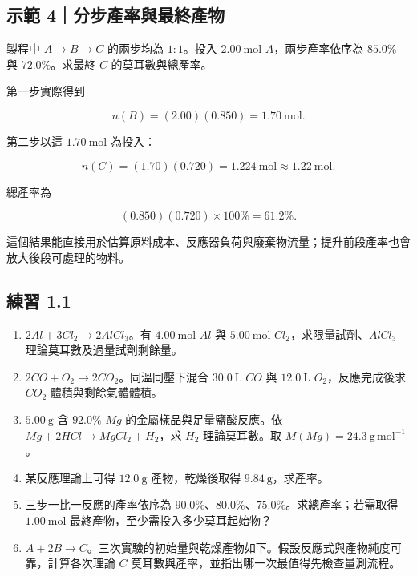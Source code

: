 \documentclass[11pt,a4paper]{article}
\providecommand{\tightlist}{%
  \setlength{\itemsep}{0pt}\setlength{\parskip}{0pt}}
\begin{document}
\begin{HandoutWorkedExample}

\subsection{示範 4｜分步產率與最終產物}\label{ux793aux7bc4-4ux5206ux6b65ux7522ux7387ux8207ux6700ux7d42ux7522ux7269}

製程中 \(A\rightarrow B\rightarrow C\) 的兩步均為 \(1:1\)。投入 \(2.00\ \mathrm{mol}\) \(A\)，兩步產率依序為 \(85.0\%\) 與 \(72.0\%\)。求最終 \(C\) 的莫耳數與總產率。

第一步實際得到

\[
n(B)=(2.00)(0.850)=1.70\ \mathrm{mol}.
\]

第二步以這 \(1.70\ \mathrm{mol}\) 為投入：

\[
n(C)=(1.70)(0.720)=1.224\ \mathrm{mol}\approx1.22\ \mathrm{mol}.
\]

總產率為

\[
(0.850)(0.720)\times100\%=61.2\%.
\]

這個結果能直接用於估算原料成本、反應器負荷與廢棄物流量；提升前段產率也會放大後段可處理的物料。

\end{HandoutWorkedExample}

\subsection{練習 1.1}\label{ux7df4ux7fd2-1.1}

\begin{enumerate}
\def\labelenumi{\arabic{enumi}.}
\tightlist
\item
  \(2Al+3Cl_2\rightarrow2AlCl_3\)。有 \(4.00\ \mathrm{mol}\) \(Al\) 與 \(5.00\ \mathrm{mol}\) \(Cl_2\)，求限量試劑、\(AlCl_3\) 理論莫耳數及過量試劑剩餘量。
\item
  \(2CO+O_2\rightarrow2CO_2\)。同溫同壓下混合 \(30.0\ \mathrm L\) \(CO\) 與 \(12.0\ \mathrm L\) \(O_2\)，反應完成後求 \(CO_2\) 體積與剩餘氣體體積。
\item
  \(5.00\ \mathrm g\) 含 \(92.0\%\) \(Mg\) 的金屬樣品與足量鹽酸反應。依 \(Mg+2HCl\rightarrow MgCl_2+H_2\)，求 \(H_2\) 理論莫耳數。取 \(M(Mg)=24.3\ \mathrm{g\,mol^{-1}}\)。
\item
  某反應理論上可得 \(12.0\ \mathrm g\) 產物，乾燥後取得 \(9.84\ \mathrm g\)，求產率。
\item
  三步一比一反應的產率依序為 \(90.0\%\)、\(80.0\%\)、\(75.0\%\)。求總產率；若需取得 \(1.00\ \mathrm{mol}\) 最終產物，至少需投入多少莫耳起始物？
\item
  \(A+2B\rightarrow C\)。三次實驗的初始量與乾燥產物如下。假設反應式與產物純度可靠，計算各次理論 \(C\) 莫耳數與產率，並指出哪一次最值得先檢查量測流程。
\end{enumerate}
\end{document}
